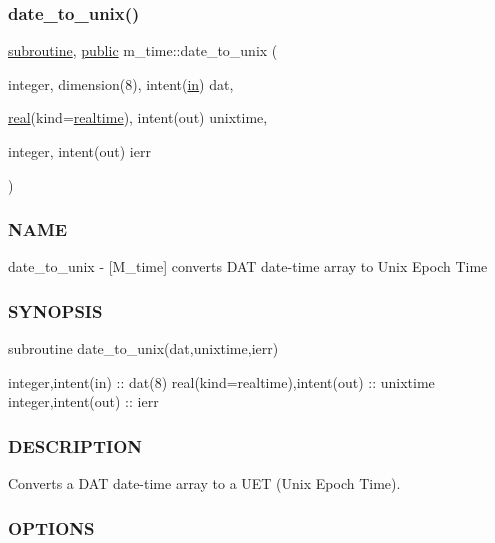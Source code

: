 \subsubsection{\texorpdfstring{date\+\_\+to\+\_\+unix()}{date\_to\_unix()}}
{\footnotesize\ttfamily \hyperlink{M__stopwatch_83_8txt_acfbcff50169d691ff02d4a123ed70482}{subroutine}, \hyperlink{M__stopwatch_83_8txt_a2f74811300c361e53b430611a7d1769f}{public} m\+\_\+time\+::date\+\_\+to\+\_\+unix (\begin{DoxyParamCaption}\item[{integer, dimension(8), intent(\hyperlink{M__journal_83_8txt_afce72651d1eed785a2132bee863b2f38}{in})}]{dat,  }\item[{\hyperlink{read__watch_83_8txt_abdb62bde002f38ef75f810d3a905a823}{real}(kind=\hyperlink{namespacem__time_ac10ea9e8d59ec74eaa7d89f2517d7422}{realtime}), intent(out)}]{unixtime,  }\item[{integer, intent(out)}]{ierr }\end{DoxyParamCaption})}



\subsubsection*{N\+A\+ME}

date\+\_\+to\+\_\+unix -\/ \mbox{[}M\+\_\+time\mbox{]} converts D\+AT date-\/time array to Unix Epoch Time 

\subsubsection*{S\+Y\+N\+O\+P\+S\+IS}

\begin{DoxyVerb}subroutine date_to_unix(dat,unixtime,ierr)

 integer,intent(in)               :: dat(8)
 real(kind=realtime),intent(out)  :: unixtime
 integer,intent(out)              :: ierr
\end{DoxyVerb}


\subsubsection*{D\+E\+S\+C\+R\+I\+P\+T\+I\+ON}

\begin{DoxyVerb}Converts a DAT date-time array to a UET (Unix Epoch Time).
\end{DoxyVerb}


\subsubsection*{O\+P\+T\+I\+O\+NS}

